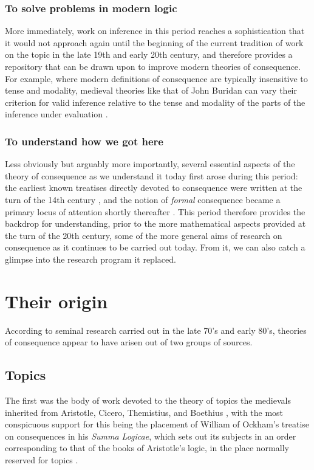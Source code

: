 \documentclass[]{article}
\begin{document}
\subsubsection{To solve problems in modern logic}
More immediately, 
work on inference in this period reaches a sophistication that it would not approach again until the beginning of the current tradition of work on the topic in the late 19th and early 20th century, 
and therefore provides a repository that can be drawn upon to improve modern theories of consequence. 
For example, 
where modern definitions of consequence are typically insensitive to tense and modality, 
medieval theories like that of John Buridan can vary their criterion for valid inference relative to the tense and modality of the parts of the inference under evaluation \autocite[63]{Read2015}.

\subsubsection{To understand how we got here}
Less obviously but arguably more importantly, 
several essential aspects of the theory of consequence as we understand it today first arose during this period: 
the earliest known treatises directly devoted to consequence were written at the turn of the 14th century \autocite{Archambault2017d}, 
and the notion of \emph{formal} consequence became a primary locus of attention shortly thereafter \autocite{DutilhNovaes2012a}. 
This period therefore provides the backdrop for understanding, 
prior to the more mathematical aspects provided at the turn of the 20th century, 
some of the more general aims of research on consequence as it continues to be carried out today. 
From it, we can also catch a glimpse into the research program it replaced. 

\section{Their origin}
According to seminal research carried out in the late 70's and early 80's,
theories of consequence appear to have arisen out of two groups of sources. 

\subsection{Topics}
The first was the body of work devoted to the theory of topics the medievals inherited from Aristotle, 
Cicero, 
Themistius, 
and Boethius \autocite{Stump1982}, 
with the most conspicuous support for this being the placement of William of Ockham's treatise on consequences in his \emph{Summa Logicae}, 
which sets out its subjects in an order corresponding to that of the books of Aristotle's logic, 
in the place normally reserved for topics \autocite{OckhamSL}.
\end{document}
